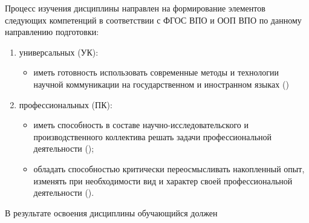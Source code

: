 
Процесс изучения дисциплины направлен на формирование элементов следующих компетенций в соответствии с ФГОС ВПО и ООП ВПО по данному направлению подготовки:
\begin{enumerate}
	\item универсальных (УК):
	\begin{itemize}
		\item иметь готовность использовать современные методы и технологии научной коммуникации на государственном и иностранном языках (\compone{})
	\end{itemize}

	\item профессиональных (ПК):
	\begin{itemize}
		\item иметь способность в составе научно-исследовательского и производственного коллектива решать задачи профессиональной деятельности (\comptwo{});
		\item обладать способностью критически переосмысливать накопленный опыт, изменять при необходимости вид и характер своей профессиональной деятельности (\compthree{}).
	\end{itemize}
\end{enumerate}

В результате освоения дисциплины обучающийся должен


